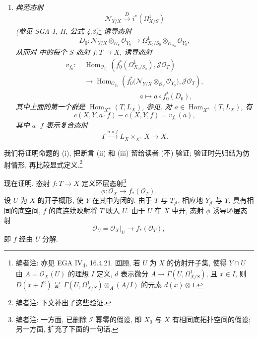\begin{enumerate}
\item[\SGAInlineRefTarget{sga3:iii:proposition:4-8:item:iii}(iii)] \textit{典范态射}
  \[
   \mathscr N_{Y/X}\xrightarrow{D}i^*(\Omega^1_{X/S})
  \]
  \textit{(参见 SGA 1, II, 公式 4.3)}\footnote{编者注: 亦见 EGA IV\textsubscript{4}, 16.4.21.
回顾, 若 \(U\) 为 \(X\) 的仿射开子集, 使得 \(Y\cap U\) 由
\(A=\mathscr O_X(U)\) 的理想 \(I\) 定义,
\(d\) 表示微分 \(A\to\Gamma(U,\Omega^1_{X/S})\), 且 \(x\in I\),
则 \(D(x+I^2)\) 是 \(\Gamma(U,\Omega^1_{X/S})\otimes_A(A/I)\)
的元素 \(d(x)\otimes1\).}
  \textit{诱导态射}
  \[
   D_0:
   \mathscr N_{Y/X}\otimes_{\mathscr O_Y}\mathscr O_{Y_0}
   \longrightarrow
   \Omega^1_{X_0/S_0}\otimes_{\mathscr O_{X_0}}\mathscr O_{Y_0},
  \]
  \textit{从而对 中的每个
\(S\)-态射 \(f:T\to X\), 诱导态射}
  \[
   \begin{split}
   v_{f_0}:\ &
   \operatorname{Hom}_{\mathscr O_{T_0}}
   \left(f_0^*(\Omega^1_{X_0/S_0}),\mathscr J\mathscr O_T\right)
   \\[-0.15em]
   &\longrightarrow
   \operatorname{Hom}_{\mathscr O_{T_0}}
   \left(
    f_0^*\bigl(\mathscr N_{Y/X}
      \otimes_{\mathscr O_Y}\mathscr O_{Y_0}\bigr),
    \mathscr J\mathscr O_T
   \right),\\
   &\hspace{8em}a\longmapsto a\circ f_0^*(D_0),
   \end{split}
  \]
  \textit{其中上面的第一个群是
\(\operatorname{Hom}_{X^+}(T,L_X)\), 参见.
对 \(a\in\operatorname{Hom}_{X^+}(T,L_X)\), 有}
  \begin{equation}
   c(X,Y,a\cdot f)-c(X,Y,f)=v_{f_0}(a),
   \tag{***}\label{sga3:iii:proposition:4-8:equation:double-starstar}
  \end{equation}
  \textit{其中 \(a\cdot f\) 表示复合态射}
  \[
   T\xrightarrow{a\times f}L_X\times_{X^+}X\longrightarrow X.
  \]
\end{enumerate}

我们将证明命题的 (i), 把断言 (ii) 和 (iii) 留给读者 (不) 验证;
验证时先归结为仿射情形, 再比较显式定义.\footnote{编者注: 下文补出了这些验证.}

现在证明.
态射 \(f:T\to X\) 定义环层态射\footnote{编者注: 一方面, 已删除 \(\mathscr I\) 幂零的假设,
即 \(X_0\) 与 \(X\) 有相同底拓扑空间的假设;
另一方面, 扩充了下面的一句话.}
\[
 \phi:\mathscr O_X\longrightarrow f_*(\mathscr O_T).
\]
设 \(U\) 为 \(X\) 的开子概形, 使 \(Y\) 在其中为闭的.
由于 \(T\) 与 \(T_{\mathscr J}\), 相应地 \(Y_{\mathscr J}\) 与 \(Y\),
具有相同的底空间, \(f\) 的底连续映射将 \(T\) 映入 \(U\).
由于 \(U\) 在 \(X\) 中开, 态射 \(\phi\) 诱导环层态射
\[
 \mathscr O_U=\mathscr O_X|_U\longrightarrow f_*(\mathscr O_T),
\]
即 \(f\) 经由 \(U\) 分解.

